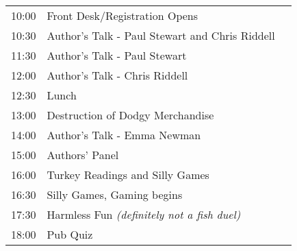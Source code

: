 \vspace{2mm} {\Large} \nopagebreak
\raggedright
\begin{center}
\begin{tabularx}{13cm}{c X l}

10:00 & Front Desk/Registration Opens\footnotemark[1] & \\
10:30 & Author's Talk - Paul Stewart and Chris Riddell\footnotemark[2] & \\
11:30 & Author's Talk - Paul Stewart\footnotemark[2]\\
12:00 & Author's Talk - Chris Riddell\footnotemark[2]\\
12:30 & Lunch\footnotemark[3] &\\
13:00 & Destruction of Dodgy Merchandise\footnotemark[4] & \\
14:00 & Author's Talk - Emma Newman\footnotemark[2]  & \\
15:00 & Authors' Panel\footnotemark[2] & \\
16:00 & Turkey Readings and Silly Games\footnotemark[2]\\
16:30 & Silly Games\footnotemark[2], Gaming begins\footnotemark[5]\\
17:30 & Harmless Fun \it(definitely not a fish duel)\footnotemark[4]  &\\
18:00 & Pub Quiz\footnotemark[3] & \\
\end{tabularx}
\end{center}

